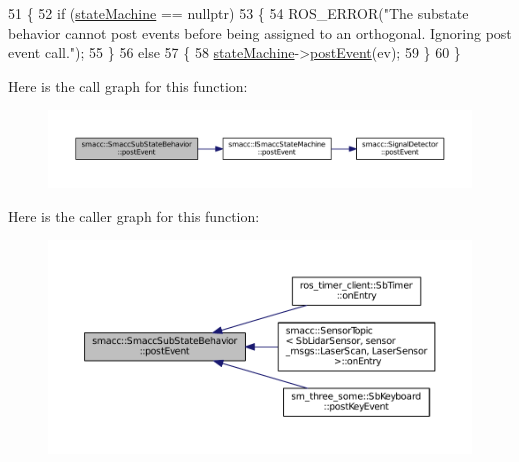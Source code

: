 \begin{DoxyCode}
51     \{
52         \textcolor{keywordflow}{if} (\hyperlink{classsmacc_1_1SmaccSubStateBehavior_ae3ff8a316bdd4bc5b7fee59d19464609}{stateMachine} == \textcolor{keyword}{nullptr})
53         \{
54             ROS\_ERROR(\textcolor{stringliteral}{"The substate behavior cannot post events before being assigned to an orthogonal.
       Ignoring post event call."});
55         \}
56         \textcolor{keywordflow}{else}
57         \{
58             \hyperlink{classsmacc_1_1SmaccSubStateBehavior_ae3ff8a316bdd4bc5b7fee59d19464609}{stateMachine}->\hyperlink{classsmacc_1_1ISmaccStateMachine_ad80cdd7bbc9a9f3b221c625754fed1ed}{postEvent}(ev);
59         \}
60     \}
\end{DoxyCode}


Here is the call graph for this function\+:
\nopagebreak
\begin{figure}[H]
\begin{center}
\leavevmode
\includegraphics[width=350pt]{classsmacc_1_1SmaccSubStateBehavior_a8538664f9828247727a27446112788a2_cgraph}
\end{center}
\end{figure}




Here is the caller graph for this function\+:
\nopagebreak
\begin{figure}[H]
\begin{center}
\leavevmode
\includegraphics[width=350pt]{classsmacc_1_1SmaccSubStateBehavior_a8538664f9828247727a27446112788a2_icgraph}
\end{center}
\end{figure}


